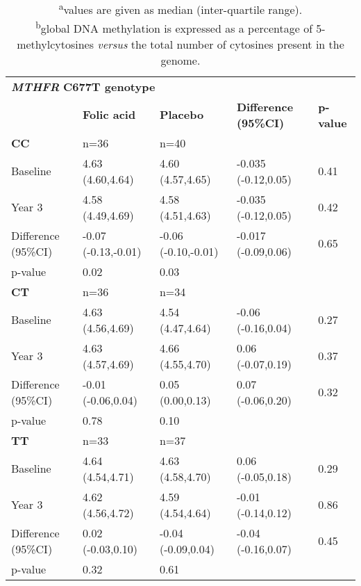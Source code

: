 \begin{table}
\small
\renewcommand*{\arraystretch}{1.1}
\caption*{\textbf{Table 4.3} Folic acid supplementation on global DNA methylation for the whole study population, for those with less than normal RBC folate status at baseline, low and high baseline methylation, and stratified by \emph{MTHFR} C677T genotype. \emph{(continued)}}
\begin{tabular}{L{2.6cm}C{2.5cm}C{2.4cm}C{2.7cm}C{1cm}}
\\
~ & \bfseries Folic acid & \bfseries Placebo & \bfseries Difference (95\%CI) & \bfseries p-value\\
\bfseries CC & n=36 & n=40 & ~ & ~ \\
 Baseline & 4.63 (4.60,4.64) & 4.60 (4.57,4.65) & {}-0.035 (-0.12,0.05) & 0.41\\
 Year 3 & 4.58 (4.49,4.69) & 4.58 (4.51,4.63) & {}-0.035 (-0.12,0.05) & 0.42\\
 Difference (95\%CI) & {}-0.07 (-0.13,-0.01) & {}-0.06 (-0.10,-0.01) & {}-0.017 (-0.09,0.06) & 0.65\\
 p-value & 0.02 & 0.03 & ~ & ~ \\
\bfseries CT & n=36 & n=34 & ~ & ~ \\
 Baseline & 4.63 (4.56,4.69) & 4.54 (4.47,4.64) & {}-0.06 (-0.16,0.04) & 0.27\\
 Year 3 & 4.63 (4.57,4.69) & 4.66 (4.55,4.70) & 0.06 (-0.07,0.19) & 0.37\\
 Difference (95\%CI) & {}-0.01 (-0.06,0.04) & 0.05 (0.00,0.13) & 0.07 (-0.06,0.20) & 0.32\\
 p-value & 0.78 & 0.10 & ~ & ~ \\
\bfseries TT & n=33 & n=37 & ~ & ~ \\
 Baseline & 4.64 (4.54,4.71) & 4.63 (4.58,4.70) & 0.06 (-0.05,0.18) & 0.29\\
 Year 3 & 4.62 (4.56,4.72) & 4.59 (4.54,4.64) & {}-0.01 (-0.14,0.12) & 0.86\\
 Difference (95\%CI) & 0.02 (-0.03,0.10) & {}-0.04 (-0.09,0.04) & {}-0.04 (-0.16,0.07) & 0.45\\
 p-value & 0.32 & 0.61 & ~ & ~ \\
\hline
\end{tabular}
\caption*{\footnotesize{\textsuperscript{a}values are given as median (inter-quartile range).\\\textsuperscript{b}global DNA methylation is expressed as a percentage of 5-methylcytosines \emph{versus} the total number of cytosines present in the genome.}}
\end{table}


